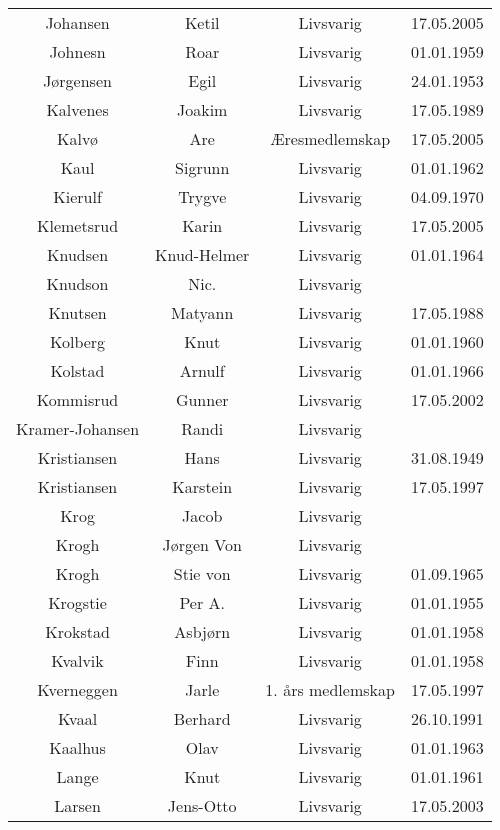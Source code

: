 \begin{tabular}{cccc}
        Johansen 	&	Ketil	&	Livsvarig	&	17.05.2005	\\
        Johnesn	&	Roar	&	Livsvarig 	&	01.01.1959	\\
        Jørgensen	&	Egil	&	Livsvarig 	&	24.01.1953	\\
        Kalvenes	&	Joakim	&	Livsvarig 	&	17.05.1989	\\
        Kalvø 	&	Are 	&	Æresmedlemskap	&	17.05.2005	\\
        Kaul	&	Sigrunn	&	Livsvarig 	&	01.01.1962	\\
        Kierulf	&	Trygve	&	Livsvarig 	&	04.09.1970	\\
        Klemetsrud 	&	Karin	&	Livsvarig	&	17.05.2005	\\
        Knudsen	&	Knud-Helmer	&	Livsvarig 	&	01.01.1964	\\
        Knudson	&	Nic.	&	Livsvarig 	&		\\
        Knutsen	&	Matyann	&	Livsvarig 	&	17.05.1988	\\
        Kolberg	&	Knut	&	Livsvarig 	&	01.01.1960	\\
        Kolstad	&	Arnulf	&	Livsvarig 	&	01.01.1966	\\
        Kommisrud 	&	Gunner	&	Livsvarig	&	17.05.2002	\\
        Kramer-Johansen	&	Randi	&	Livsvarig 	&		\\
        Kristiansen	&	Hans	&	Livsvarig 	&	31.08.1949	\\
        Kristiansen 	&	Karstein	&	Livsvarig	&	17.05.1997	\\
        Krog	&	Jacob	&	Livsvarig 	&		\\
        Krogh	&	Jørgen Von	&	Livsvarig 	&		\\
        Krogh	&	Stie von	&	Livsvarig 	&	01.09.1965	\\
        Krogstie	&	Per A.	&	Livsvarig 	&	01.01.1955	\\
        Krokstad	&	Asbjørn	&	Livsvarig 	&	01.01.1958	\\
        Kvalvik	&	Finn	&	Livsvarig 	&	01.01.1958	\\
        Kverneggen 	&	Jarle 	&	1. års medlemskap	&	17.05.1997	\\
        Kvaal	&	Berhard	&	Livsvarig 	&	26.10.1991	\\
        Kaalhus	&	Olav	&	Livsvarig 	&	01.01.1963	\\
        Lange	&	Knut	&	Livsvarig 	&	01.01.1961	\\
        Larsen 	&	Jens-Otto	&	Livsvarig	&	17.05.2003	\\

\end{tabular}
